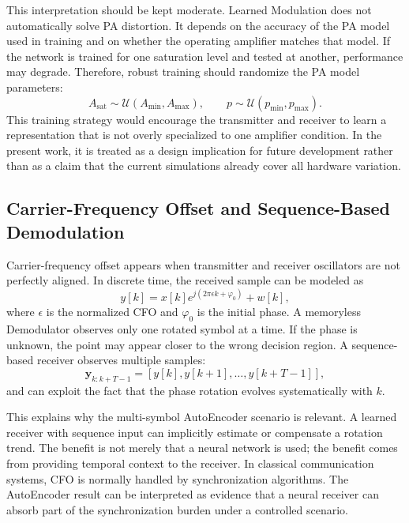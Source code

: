 This interpretation should be kept moderate. Learned Modulation does not automatically solve PA distortion. It depends on the accuracy of the PA model used in training and on whether the operating amplifier matches that model. If the network is trained for one saturation level and tested at another, performance may degrade. Therefore, robust training should randomize the PA model parameters:
\begin{equation}
  A_{\mathrm{sat}}\sim\mathcal{U}(A_{\min},A_{\max}), \qquad
  p\sim\mathcal{U}(p_{\min},p_{\max}).
\end{equation}
This training strategy would encourage the transmitter and receiver to learn a representation that is not overly specialized to one amplifier condition. In the present work, it is treated as a design implication for future development rather than as a claim that the current simulations already cover all hardware variation.

\subsection{Carrier-Frequency Offset and Sequence-Based Demodulation}
Carrier-frequency offset appears when transmitter and receiver oscillators are not perfectly aligned. In discrete time, the received sample can be modeled as
\begin{equation}
  y[k]=x[k]e^{j(2\pi\epsilon k+\varphi_0)}+w[k],
\end{equation}
where $\epsilon$ is the normalized CFO and $\varphi_0$ is the initial phase. A memoryless Demodulator observes only one rotated symbol at a time. If the phase is unknown, the point may appear closer to the wrong decision region. A sequence-based receiver observes multiple samples:
\begin{equation}
  \mathbf{y}_{k:k+T-1}=[y[k],y[k+1],\ldots,y[k+T-1]],
\end{equation}
and can exploit the fact that the phase rotation evolves systematically with $k$.

This explains why the multi-symbol AutoEncoder scenario is relevant. A learned receiver with sequence input can implicitly estimate or compensate a rotation trend. The benefit is not merely that a neural network is used; the benefit comes from providing temporal context to the receiver. In classical communication systems, CFO is normally handled by synchronization algorithms. The AutoEncoder result can be interpreted as evidence that a neural receiver can absorb part of the synchronization burden under a controlled scenario.

